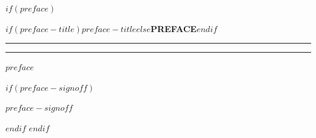 $if(preface)$
\cleardoublepage
\pagestyle{frontmatter}
\thispagestyle{plain}
\vspace*{120pt}
{\centering\chapterheadingfont\bfseries\Large{}\MakeTextUppercase{$if(preface-title)$$preface-title$$else$Preface$endif$}\par}
\vspace{12pt}
{\centering\rule[0.5ex]{2cm}{0.4pt}\hspace{0.8em}\rule[0.5ex]{2cm}{0.4pt}\par}
\vspace{20pt}
\label{preface}

\begingroup
\primaryfont\normalsize
\setlength{\parindent}{1.5em}
\noindent
$preface$

$if(preface-signoff)$
\vspace{24pt}
\begin{flushright}
{\scshape{}\MakeTextLowercase{$preface-signoff$}}
\end{flushright}
$endif$
\endgroup
$endif$
